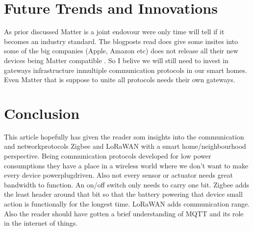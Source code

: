 \documentclass[article,a4paper]{IEEEtran}
\begin{document}
    \section{Future Trends and Innovations}
    As prior discussed Matter is a joint endovour were only time will tell if it becomes an industry standard. The blogposts read does give some insites into some of the big companies (Apple, Amazon etc) does not release all their new devices being Matter compatible \cite{BlogMatter}. So I belive we will still need to invest in gateways infrastructure inmultiple communication protocols in our smart homes. Even Matter that is suppose to unite all protocols needs their own gateways.
    \section{Conclusion}
    This article hopefully has given the reader som insights into the communication and networkprotocols Zigbee and LoRaWAN with a smart home/neighbourhood perspective. Being communication protocols developed for low power consumptions they have a place in a wireless world where we don't want to make every device powerplugdriven. Also not every sensor or actuator needs great bandwidth to function. An on/off switch only needs to carry one bit. Zigbee adds the least header around that bit so that the battery powering that device small action is functionally for the longest time. LoRaWAN adds communication range. Also the reader should have gotten a brief understanding of MQTT and its role in the internet of things.   
\printbibliography
\end{document}

